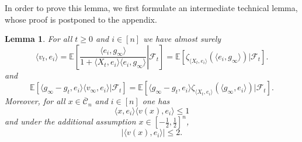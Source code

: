 \documentclass[12pt]{article}
\def \EE {\mathbb E}
\def \CC {\mathbb C}
\def \FF {\mathcal{F}}
\def \CC {\overline{\mathcal{C}}_n}
\newtheorem{lemma}[theorem]{Lemma}
\theoremstyle{definition}
\theoremstyle{remark}
\begin{document}
In order to prove this lemma, we first formulate an intermediate technical lemma, whose proof is postponed to the appendix.
\begin{lemma} \label{lem:vtcoord}
For all $t \geq 0$ and $i \in [n]$ we have almost surely	
\begin{equation}\label{eq:vtcoord}
\langle v_t, e_i \rangle = \left . \EE \left [ \frac{\langle e_i, g_\infty \rangle}{1 + \langle X_t, e_i \rangle \langle e_i, g_\infty \rangle} \right | \FF_t \right ] = \EE \left [ \zeta_{\langle X_t, e_i \rangle} \left (\langle e_i, g_\infty \rangle\right ) | \FF_t \right ].
\end{equation}
and
\begin{equation}\label{eq:vtcoord2}
\EE[ \langle g_\infty - g_t, e_i \rangle  \langle v_\infty, e_i \rangle | \FF_t ] = \EE[ \langle g_\infty - g_t, e_i \rangle \zeta_{\langle X_t, e_i \rangle}(\langle g_\infty, e_i \rangle) | \FF_t].
\end{equation}
Moreover, for all $x \in \CC$ and $i \in [n]$ one has
\begin{equation}\label{eq:vtbound2}
\langle x, e_i \rangle \langle v(x), e_i \rangle \leq 1
\end{equation}
and under the additional assumption $x \in \left [-\tfrac{1}{2}, \tfrac{1}{2} \right ]^n$,
\begin{equation}\label{eq:vtbound}
|\langle v(x), e_i \rangle| \leq 2.
\end{equation}
\end{lemma}
\end{document}
